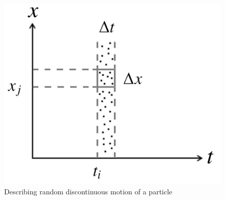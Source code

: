 \begin{center} 
\begin{figure}[h]\label{rdm}

\includegraphics[scale=0.50]{fig74.jpg}


\caption{Describing random discontinuous motion of a particle}

\end{figure}

\end{center} 


